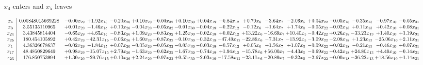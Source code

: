 \documentclass[9pt]{article}
\begin{document}
 $ x_{4} $ enters and $ x_{5} $ leaves 

 \[\begin{array}{c| c c@{\hskip 2pt} c@{\hskip 2pt} c@{\hskip 2pt} c@{\hskip 2pt} c@{\hskip 2pt} c@{\hskip 2pt} c@{\hskip 2pt} c@{\hskip 2pt} c@{\hskip 2pt} c@{\hskip 2pt} c@{\hskip 2pt} c@{\hskip 2pt} c@{\hskip 2pt} c@{\hskip 2pt} c@{\hskip 2pt} c@{\hskip 2pt} }
 x_{4}   &  0.00848015669228 & -0.00 x_{29} & +  1.92 x_{15} & -0.20 x_{26} & +  0.10 x_{20} & +  0.00 x_{32} & +  0.10 x_{30} & +  0.04 x_{19} & -0.84 x_{12} & +  0.79 x_{6} & -3.64 x_{7} & -2.06 x_{5} & +  0.04 x_{22} & -0.05 x_{18} & -0.35 x_{13} & -0.97 x_{10} & -0.05 x_{31}\\
 x_{3}   &  3.55135110965 & +  0.01 x_{29} & -1.46 x_{15} & +  0.10 x_{26} & -0.04 x_{20} & +  0.05 x_{32} & -0.01 x_{30} & -0.04 x_{19} & -0.22 x_{12} & -0.12 x_{6} & +  1.64 x_{7} & +  1.74 x_{5} & -0.05 x_{22} & -0.02 x_{18} & +  0.11 x_{13} & +  0.42 x_{10} & +  0.08 x_{31}\\
 x_{24}   &  3.43845814404 & -0.65 x_{29} & +  4.65 x_{15} & -0.83 x_{26} & +  1.09 x_{20} & +  0.83 x_{32} & +  1.25 x_{30} & -0.02 x_{19} & +  0.02 x_{12} & + 13.22 x_{6} & -16.69 x_{7} & + 10.40 x_{5} & -0.42 x_{22} & +  0.26 x_{18} & -33.23 x_{13} & +  1.40 x_{10} & +  1.19 x_{31}\\
 x_{25}   &  180.454105892 & +  0.42 x_{29} & -42.31 x_{15} & -0.06 x_{26} & +  1.60 x_{20} & +  0.87 x_{32} & -0.10 x_{30} & -0.32 x_{19} & -47.49 x_{12} & -22.89 x_{6} & -7.31 x_{7} & -13.92 x_{5} & -3.09 x_{22} & -2.08 x_{18} & +  1.23 x_{13} & -25.06 x_{10} & +  2.11 x_{31}\\
 x_{1}   &  4.36326678637 & -0.02 x_{29} & -1.84 x_{15} & +  0.07 x_{26} & -0.05 x_{20} & +  0.05 x_{32} & -0.03 x_{30} & -0.03 x_{19} & -0.57 x_{12} & +  0.05 x_{6} & +  1.56 x_{7} & +  1.07 x_{5} & -0.09 x_{22} & -0.02 x_{18} & -0.21 x_{13} & -0.46 x_{10} & +  0.07 x_{31}\\
 x_{17}   &  48.4850829649 & +  0.98 x_{29} & -15.07 x_{15} & +  2.79 x_{26} & -1.63 x_{20} & -0.62 x_{32} & -1.67 x_{30} & -0.74 x_{19} & +  1.94 x_{12} & -15.78 x_{6} & + 56.00 x_{7} & -4.43 x_{5} & -0.69 x_{22} & -0.42 x_{18} & + 24.80 x_{13} & +  4.49 x_{10} & -0.14 x_{31}\\
 x_{23}   &  176.850753994 & +  1.30 x_{29} & -29.76 x_{15} & +  0.10 x_{26} & +  2.24 x_{20} & +  0.97 x_{32} & +  0.55 x_{30} & -2.03 x_{19} & -17.58 x_{12} & -23.11 x_{6} & -20.89 x_{7} & -9.32 x_{5} & -2.67 x_{22} & -0.00 x_{18} & -36.22 x_{13} & + 18.56 x_{10} & +  1.14 x_{31}\\

\end{array}\]
\end{document}

